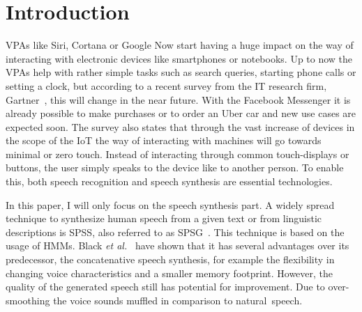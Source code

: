 

\section{Introduction}
\label{sec:introduction}

\acp{VPA} like Siri, Cortana or Google Now start having a huge impact on the way of interacting with electronic devices like smartphones or notebooks. Up to now the \acp{VPA} help with rather simple tasks such as search queries, starting phone calls or setting a clock, but according to a recent survey from the IT research firm, Gartner~\cite{gartner:assistants}, this will change in the near future. With the Facebook Messenger it is already possible to make purchases or to order an Uber car and new use cases are expected soon. The survey also states that through the vast increase of devices in the scope of the \ac{IoT} the way of interacting with machines will go towards minimal or zero touch. Instead of interacting through common touch-displays or buttons, the user simply speaks to the device like to another person. To enable this, both speech recognition and speech synthesis are essential technologies.

In this paper, I will only focus on the speech synthesis part. A widely spread technique to synthesize human speech from a given text or from linguistic descriptions is \acf{SPSS}, also referred to as \ac{SPSG}~\cite{ling:deep}. This technique is based on the usage of \acp{HMM}. Black \textit{et al.}~\cite{black:statistical} have shown that it has several advantages over its predecessor, the concatenative speech synthesis, for example the flexibility in changing voice characteristics and a smaller memory footprint. However, the quality of the generated speech still has potential for improvement. Due to over-smoothing the voice sounds muffled in comparison to natural~speech.

